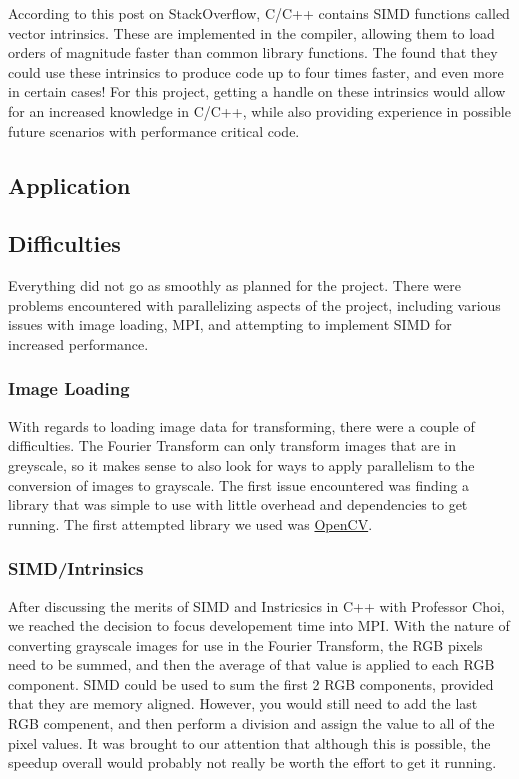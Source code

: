 \documentclass[12pt]{extarticle}
\begin{document}
    According to this post\cite{Konstantin:2020} on StackOverflow, C/C++ contains SIMD functions called vector intrinsics.
    These are implemented in the compiler, allowing them to load orders of magnitude faster than common library functions. 
    The found that they could use these intrinsics to produce code up to four times faster, and even more in certain cases!
    For this project, getting a handle on these intrinsics would allow for an increased knowledge in C/C++, while also providing
    experience in possible future scenarios with performance critical code.

\subsection*{Application}

\subsection*{Difficulties}
	Everything did not go as smoothly as planned for the project. There were problems encountered with parallelizing aspects of the 
	project, including various issues with image loading, MPI, and attempting to implement SIMD for increased performance.

	\subsubsection*{Image Loading}
	With regards to loading image data for transforming, there were a couple of difficulties. The Fourier Transform can only transform images
	that are in greyscale, so it makes sense to also look for ways to apply parallelism to the conversion of images to grayscale.
	The first issue encountered was finding a library that was simple to use with little overhead and dependencies to get running. 
	The first attempted library we used was \href{https://opencv.org/}{OpenCV}.
	
	\subsubsection*{SIMD/Intrinsics}
	After discussing the merits of SIMD and Instricsics in C++ with Professor Choi, we reached the decision to focus developement time into
	MPI. With the nature of converting grayscale images for use in the Fourier Transform, the RGB pixels need to be summed, and then the average
	of that value is applied to each RGB component. SIMD could be used to sum the first 2 RGB components, provided that they are memory aligned. 
	However, you would still need to add the last RGB compenent, and then perform a division and assign the value to all of the pixel values.
	It was brought to our attention that although this is possible, the speedup overall would probably not really be worth the effort to get it
	running.
\end{document}
